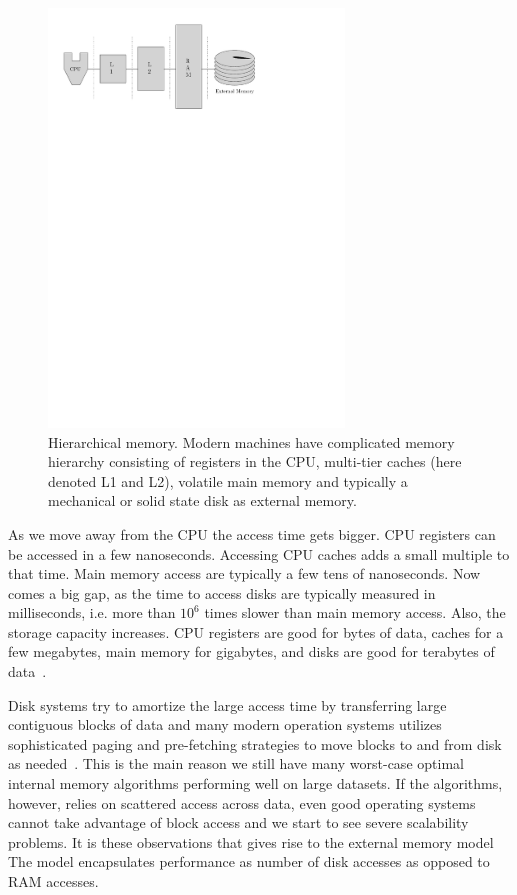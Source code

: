 \documentclass[twoside,11pt,openright]{report}
\begin{document}
\begin{figure}
	\centering
		\includegraphics[width=0.7\textwidth]{../figures/real_computer}
	\caption{Hierarchical memory. Modern machines have complicated memory hierarchy consisting of registers in the CPU, multi-tier caches (here denoted L1 and L2), volatile main memory and typically a mechanical or solid state disk as external memory.}
	\label{fig:real_computer}
\end{figure}

As we move away from the CPU the access time gets bigger. CPU registers can be accessed in a few nanoseconds. Accessing CPU caches adds a small multiple to that time. Main memory access are typically a few tens of nanoseconds. Now comes a big gap, as the time to access disks are typically measured in milliseconds, i.e. more than $10^6$ times slower than main memory access. Also, the storage capacity increases. CPU registers are good for bytes of data, caches for a few megabytes, main memory for gigabytes, and disks are good for terabytes of data~\cite{Tanenbaum:1998:SCO:552473}.

Disk systems try to amortize the large access time by transferring large contiguous blocks of data and many modern operation systems utilizes sophisticated paging and pre-fetching strategies to move blocks to and from disk as needed~\cite{Tanenbaum:2007:MOS:1410217}. This is the main reason we still have many worst-case optimal internal memory algorithms performing well on large datasets. If the algorithms, however, relies on scattered access across data, even good operating systems cannot take advantage of block access and we start to see severe scalability problems. It is these observations that gives rise to the external memory model The model encapsulates performance as number of disk accesses as opposed to RAM accesses.
\end{document}
